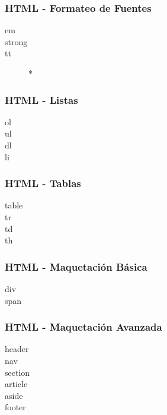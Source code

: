 \documentclass[a4paper,slidestop,xcolor=pst,blue]{beamer}
\begin{document}
\begin{frame}[c]
    \frametitle{HTML - Formateo de Fuentes}
    \begin{description}
        \item[em]
        \item[strong]
        \item[tt] *
    \end{description}
\end{frame}

\begin{frame}[c]
    \frametitle{HTML - Listas}
    \begin{description}
        \item[ol]
        \item[ul]
        \item[dl]
        \item[li]
    \end{description}
\end{frame}

\begin{frame}[c]
    \frametitle{HTML - Tablas}
    \begin{description}
        \item[table]
        \item[tr]
        \item[td]
        \item[th]
    \end{description}
\end{frame}

\begin{frame}[c]
    \frametitle{HTML - Maquetación Básica}
    \begin{description}
        \item[div]
        \item[span]
    \end{description}
\end{frame}

\begin{frame}[c]
    \frametitle{HTML - Maquetación Avanzada}
    \begin{description}
        \item[header]
        \item[nav]
        \item[section]
        \item[article]
        \item[aside]
        \item[footer]
    \end{description}
\end{frame}
\end{document}

